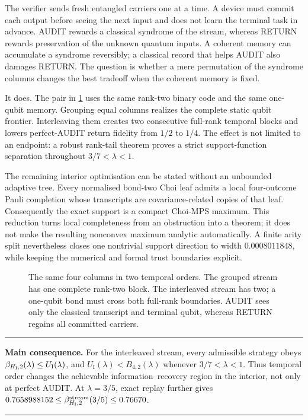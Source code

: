 \documentclass[10pt,twocolumn]{article}
\theoremstyle{remark}
\newcommand{\BG}{B_{4,2}}
\newcommand{\UI}{U_{\mathrm I}}
\newenvironment{resultbox}
  {\par\smallskip\noindent\begin{minipage}{\columnwidth}\small
   \color{linkblue}\rule{\columnwidth}{0.5pt}\par\smallskip
   \textbf{Main consequence.}\enspace\color{black}}
  {\par\smallskip\color{linkblue}\rule{\columnwidth}{0.5pt}\end{minipage}\par\smallskip}
\begin{document}
The verifier sends fresh entangled carriers one at a time. A device must commit
each output before seeing the next input and does not learn the terminal task
in advance. AUDIT rewards a classical syndrome of the stream, whereas RETURN
rewards preservation of the unknown quantum inputs. A coherent memory can
accumulate a syndrome reversibly; a classical record that helps AUDIT also
damages RETURN. The question is whether a mere permutation of the syndrome
columns changes the best tradeoff when the coherent memory is fixed.

It does. The pair in \cref{fig:orders} uses the same rank-two binary code and
the same one-qubit memory. Grouping equal columns realizes the complete static
qubit frontier. Interleaving them creates two consecutive full-rank temporal
blocks and lowers perfect-AUDIT return fidelity from $1/2$ to $1/4$. The
effect is not limited to an endpoint: a robust rank-tail theorem proves a
strict support-function separation throughout $3/7<\lambda<1$.

The remaining interior optimisation can be stated without an unbounded
adaptive tree. Every normalised bond-two Choi leaf admits a local
four-outcome Pauli completion whose transcripts are covariance-related copies
of that leaf. Consequently the exact support is a compact Choi-MPS maximum.
This reduction turns local completeness from an obstruction into a theorem;
it does not make the resulting nonconvex maximum analytic automatically. A
finite arity split nevertheless closes one nontrivial support direction to
width $0.0008011848$, while keeping the numerical and formal trust boundaries
explicit.

\begin{figure}[t]
\centering
\resizebox{0.94\textwidth}{!}{}
\caption{The same four columns in two temporal orders. The grouped stream has
one complete rank-two block. The interleaved stream has two; a one-qubit bond
must cross both full-rank boundaries. AUDIT sees only the classical transcript
and terminal qubit, whereas RETURN regains all committed carriers.}
\label{fig:orders}
\end{figure}

\begin{resultbox}
For the interleaved stream, every admissible strategy obeys
$\beta_{H_{\rm I},2}(\lambda)\leq\UI(\lambda)$, and
$\UI(\lambda)<\BG(\lambda)$ whenever $3/7<\lambda<1$. Thus temporal order
changes the achievable information--recovery region in the interior, not only
at perfect AUDIT.
At $\lambda=3/5$, exact replay further gives
$0.7658988152\leq\beta^{\rm stream}_{H_{\rm I},2}(3/5)\leq0.76670$.
\end{resultbox}
\end{document}
